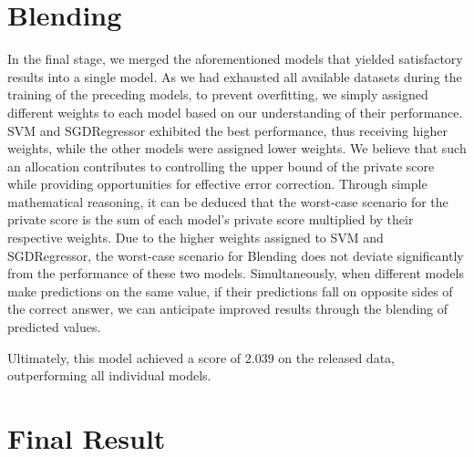 \documentclass[10pt,letterpaper]{article}
\begin{document}
\section{Blending}

In the final stage, we merged the aforementioned models that yielded satisfactory results into a single model. 
As we had exhausted all available datasets during the training of the preceding models, 
to prevent overfitting, we simply assigned different weights to each model based on our understanding of their performance. 
SVM and SGDRegressor exhibited the best performance, thus receiving higher weights, 
while the other models were assigned lower weights. 
We believe that such an allocation contributes to controlling the upper bound of the private score while providing opportunities for effective error correction. 
Through simple mathematical reasoning, 
it can be deduced that the worst-case scenario for the private score is the sum of each model's private score multiplied by their respective weights. 
Due to the higher weights assigned to SVM and SGDRegressor, the worst-case scenario for Blending does not deviate significantly from the performance of these two models. 
Simultaneously, when different models make predictions on the same value, 
if their predictions fall on opposite sides of the correct answer, 
we can anticipate improved results through the blending of predicted values.

Ultimately, this model achieved a score of $2.039$ on the released data, outperforming all individual models.

\section{Final Result}

\newpage






\end{document}

